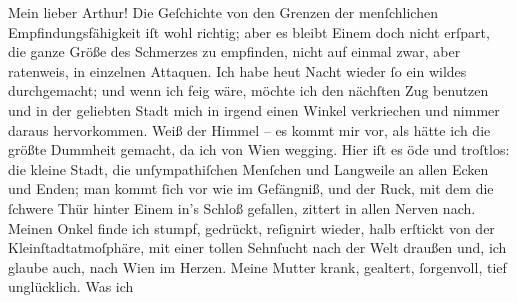 \pstart\center{}Mein lieber Arthur!\pend\vspace{0.5em}
\pstart
           Die Geſchichte von den Grenzen der menſchlichen Empfindungsfähigkeit iſt wohl
               richtig; aber es bleibt Einem doch nicht erſpart, die ganze Größe des Schmerzes zu
               empfinden, nicht auf einmal zwar, aber ratenweis, in einzelnen Attaquen. Ich habe
                  heut{ }Nacht wieder{ }ſo ein wildes \label{K_L02660-1v}\label{K_L02660-1} durchgemacht; und wenn ich feig wäre, möchte ich den nächſten Zug
               benutzen und in der geliebten Stadt mich in irgend einen Winkel verkriechen und nimmer daraus
               hervorkommen. Weiß der Himmel – es kommt mir vor, als hätte ich die größte Dummheit
               gemacht, da ich von Wien wegging. Hier iſt es öde
               und troſtlos: die kleine Stadt,
               die unſympathiſchen Menſchen und Langweile an allen Ecken und Enden; man kommt{ }ſich
               vor wie im Gefängniß, und der Ruck, mit dem {\pb}die{ }ſchwere Thür hinter Einem in’s Schloß gefallen, zittert in allen Nerven nach. Meinen
                  Onkel finde ich stumpf,
               gedrückt, reſignirt wieder, halb erſtickt von der Kleinſtadtatmoſphäre, mit einer
               tollen Sehnſucht nach der Welt draußen und, ich glaube auch, nach Wien im Herzen. Meine Mutter krank, gealtert,{ }ſorgenvoll, tief unglücklich. Was ich
